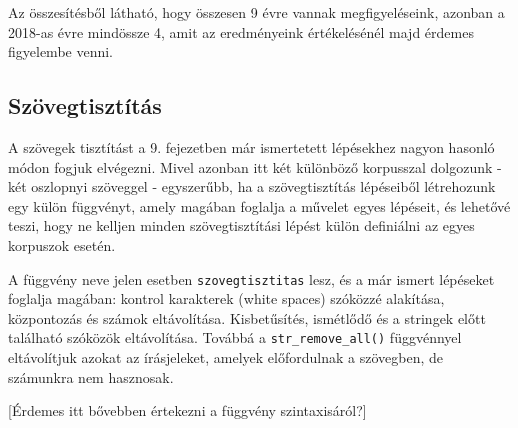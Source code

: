 \documentclass[
]{book}
\begin{document}
Az összesítésből látható, hogy összesen 9 évre vannak megfigyeléseink,
azonban a 2018-as évre mindössze 4, amit az eredményeink értékelésénél
majd érdemes figyelembe venni.

\hypertarget{szuxf6vegtisztuxedtuxe1s}{%
\subsection{Szövegtisztítás}\label{szuxf6vegtisztuxedtuxe1s}}

A szövegek tisztítást a 9. fejezetben már ismertetett lépésekhez nagyon
hasonló módon fogjuk elvégezni. Mivel azonban itt két különböző
korpusszal dolgozunk - két oszlopnyi szöveggel - egyszerűbb, ha a
szövegtisztítás lépéseiből létrehozunk egy külön függvényt, amely
magában foglalja a művelet egyes lépéseit, és lehetővé teszi, hogy ne
kelljen minden szövegtisztítási lépést külön definiálni az egyes
korpuszok esetén.

A függvény neve jelen esetben \texttt{szovegtisztitas} lesz, és a már
ismert lépéseket foglalja magában: kontrol karakterek (white spaces)
szóközzé alakítása, központozás és számok eltávolítása. Kisbetűsítés,
ismétlődő és a stringek előtt található szóközök eltávolítása. Továbbá a
\texttt{str\_remove\_all()} függvénnyel eltávolítjuk azokat az
írásjeleket, amelyek előfordulnak a szövegben, de számunkra nem
hasznosak.

{[}Érdemes itt bővebben értekezni a függvény szintaxisáról?{]}
\end{document}
